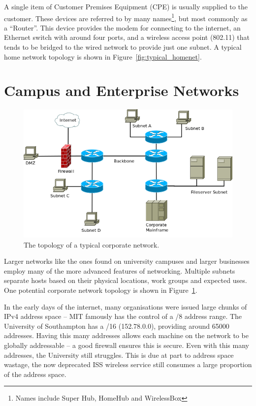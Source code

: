 \documentclass[12pt,a4paper,twoside]{report}
\begin{document}
A single item of Customer Premises Equipment (CPE)  is usually supplied to the customer. These devices are
referred to by many names\footnote{Names include Super Hub, HomeHub and
WirelessBox}, but most commonly as a ``Router''.  This device provides the modem for
connecting to the internet, an Ethernet switch with around four ports, and a
wireless access point (802.11) that tends to be bridged to the wired network to
provide just one subnet. A typical home network topology is shown in
Figure~\ref{fig:typical_homenet}.

\section{Campus and Enterprise Networks}
\begin{figure}
\begin{center}
	\includegraphics[width=\linewidth]{../Diagrams/Network/CorporateNetwork.png}
	\caption{The topology of a typical corporate network.}\label{fig:corporate_net}
\end{center}
\end{figure}
Larger networks like the ones found on university campuses and larger
businesses employ many of the more advanced features of networking.  Multiple
subnets separate hosts based on their physical locations, work groups and
expected uses. One potential corporate network topology is shown in
Figure~\ref{fig:corporate_net}.

In the early days of the internet, many organisations were issued large chunks
of IPv4 address space -- MIT famously has the control of a /8 address
range\cite{IPv4IANA}. The University of Southampton has a /16 (152.78.0.0),
providing around 65000 addresses. Having this many addresses allows each
machine on the network to be globally addressable -- a good firewall ensures
this is secure.  Even with this many addresses, the University still struggles.
This is due at part to address space wastage, the now deprecated ISS wireless
service still consumes a large proportion of the address space.
\end{document}
